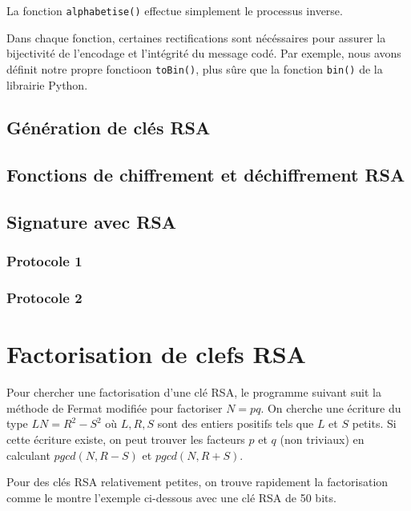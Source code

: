 \documentclass[titlepage]{article}
\begin{document}
    

    La fonction \texttt{alphabetise()} effectue simplement le processus inverse.
    
    

    Dans chaque fonction, certaines rectifications sont nécéssaires pour assurer la bijectivité de l'encodage et l'intégrité du message codé. Par exemple, nous avons définit notre propre fonctioon \texttt{toBin()}, plus sûre que la fonction \texttt{bin()} de la librairie Python. 

    \subsection{Génération de clés RSA}

    \subsection{Fonctions de chiffrement et déchiffrement RSA}

    \subsection{Signature avec RSA}
    \subsubsection{Protocole 1}
    \subsubsection{Protocole 2}

    \section{Factorisation de clefs RSA}
    Pour chercher une factorisation d'une clé RSA, le programme suivant suit la méthode de Fermat modifiée pour factoriser $N = pq$.
    On cherche une écriture du type $LN = R^2 - S^2$ où $L,R,S$ sont des entiers positifs tels que $L$ et $S$ petits.
    Si cette écriture existe, on peut trouver les facteurs $p$ et $q$ (non triviaux) en calculant $pgcd(N,R-S)$ et $ pgcd(N,R+S)$.

    

    Pour des clés RSA relativement petites, on trouve rapidement la factorisation comme le montre l'exemple ci-dessous avec une clé RSA de 50 bits. \bigbreak
\end{document}
